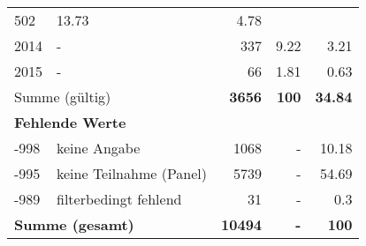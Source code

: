 \begin{longtable}{lXrrr}
       \num{502} &
       \num[round-mode=places,round-precision=2]{13,73} &
         \num[round-mode=places,round-precision=2]{4,78} \\

     2014 &
     \multicolumn{1}{X}{ -  } &


       \num{337} &
       \num[round-mode=places,round-precision=2]{9,22} &
         \num[round-mode=places,round-precision=2]{3,21} \\

     2015 &
     \multicolumn{1}{X}{ -  } &


       \num{66} &
       \num[round-mode=places,round-precision=2]{1,81} &
         \num[round-mode=places,round-precision=2]{0,63} \\
     \midrule
     \multicolumn{2}{l}{Summe (gültig)} &
       \textbf{\num{3656}} &
     \textbf{100} &
       \textbf{\num[round-mode=places,round-precision=2]{34,84}} \\
     \multicolumn{5}{l}{\textbf{Fehlende Werte}}\\
       -998 &
       keine Angabe &
         \num{1068} &
        - &
         \num[round-mode=places,round-precision=2]{10,18} \\
       -995 &
       keine Teilnahme (Panel) &
         \num{5739} &
        - &
         \num[round-mode=places,round-precision=2]{54,69} \\
       -989 &
       filterbedingt fehlend &
         \num{31} &
        - &
         \num[round-mode=places,round-precision=2]{0,3} \\
     \midrule
     \multicolumn{2}{l}{\textbf{Summe (gesamt)}} &
          \textbf{\num{10494}} &
        \textbf{-} &
        \textbf{100} \\
     \bottomrule
     \end{longtable}
     
